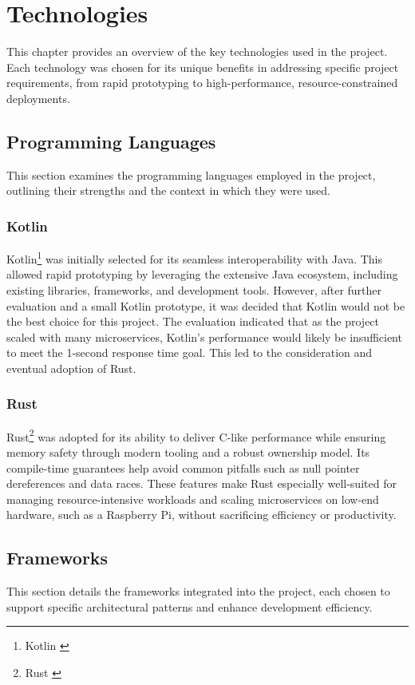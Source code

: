 \cleardoubleemptypage
\renewcommand*\chapterpagestyle{scrheadings}
\chapter{Technologies}

This chapter provides an overview of the key
technologies used in the project.
Each technology was chosen for its unique benefits in
addressing specific project requirements, from rapid
prototyping to high-performance, resource-constrained deployments.

\section{Programming Languages}
This section examines the programming languages employed
in the project,
outlining their strengths and the context in which they
were used.

\subsection{Kotlin}
Kotlin\footnote{Kotlin \cite{kotlin}} was initially selected
for its seamless interoperability with Java.
This allowed rapid prototyping by leveraging the extensive
Java ecosystem, including existing libraries, frameworks,
and development tools.
However, after further evaluation and a small Kotlin prototype,
it was decided that Kotlin would not be the best choice for this project.
The evaluation indicated that as the project scaled with many microservices,
Kotlin's performance would likely be insufficient to meet the 1-second response time goal.
This led to the consideration and eventual adoption of Rust.

\subsection{Rust}
Rust\footnote{Rust \cite{rust}} was adopted for its ability to
deliver C-like performance
while ensuring memory safety through modern tooling and a robust
ownership model.
Its compile-time guarantees help avoid common pitfalls such as
null pointer dereferences and data races.
These features make Rust especially well-suited for managing
resource-intensive workloads
and scaling microservices on low-end hardware, such as a Raspberry Pi,
without sacrificing efficiency or productivity.

\section{Frameworks}
This section details the frameworks integrated into the project,
each chosen to support specific architectural patterns and
enhance development efficiency.

